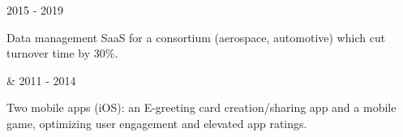 \begin{cventries}

  \cventrythin
    {} %
    {2015 - 2019} %
    {
          \begin{cvitems} %
			\item {Data management SaaS for a consortium (aerospace, automotive) which cut turnover time by 30\%.} 
	      \end{cvitems}
    }
    



  \cventrythin
    { \& } %
    {2011 - 2014} %
    {
          \begin{cvitems} %
				\item {Two mobile apps (iOS): an E-greeting card creation/sharing app and a mobile game, optimizing user engagement and elevated app ratings.}
	      \end{cvitems}
    }



\end{cventries}
